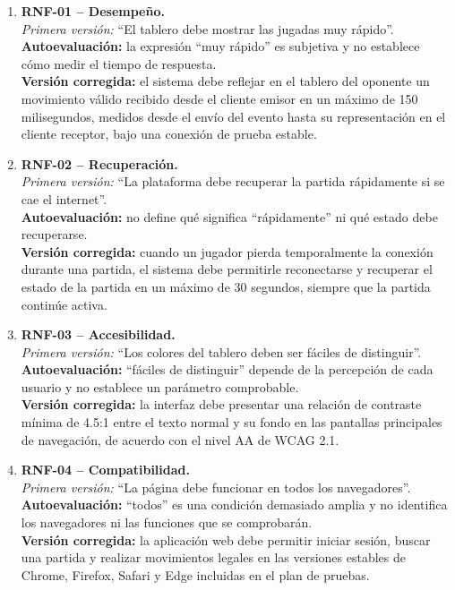 \documentclass[12pt,a4paper]{article}
\begin{document}
\begin{enumerate}[leftmargin=*]
    \item \textbf{RNF-01 -- Desempeño.}\\
    \textit{Primera versión:} ``El tablero debe mostrar las jugadas muy rápido''.\\
    \textbf{Autoevaluación:} la expresión ``muy rápido'' es subjetiva y no establece cómo medir el tiempo de respuesta.\\
    \textbf{Versión corregida:} el sistema debe reflejar en el tablero del oponente un movimiento válido recibido desde el cliente emisor en un máximo de 150 milisegundos, medidos desde el envío del evento hasta su representación en el cliente receptor, bajo una conexión de prueba estable.

    \item \textbf{RNF-02 -- Recuperación.}\\
    \textit{Primera versión:} ``La plataforma debe recuperar la partida rápidamente si se cae el internet''.\\
    \textbf{Autoevaluación:} no define qué significa ``rápidamente'' ni qué estado debe recuperarse.\\
    \textbf{Versión corregida:} cuando un jugador pierda temporalmente la conexión durante una partida, el sistema debe permitirle reconectarse y recuperar el estado de la partida en un máximo de 30 segundos, siempre que la partida continúe activa.

    \item \textbf{RNF-03 -- Accesibilidad.}\\
    \textit{Primera versión:} ``Los colores del tablero deben ser fáciles de distinguir''.\\
    \textbf{Autoevaluación:} ``fáciles de distinguir'' depende de la percepción de cada usuario y no establece un parámetro comprobable.\\
    \textbf{Versión corregida:} la interfaz debe presentar una relación de contraste mínima de 4.5:1 entre el texto normal y su fondo en las pantallas principales de navegación, de acuerdo con el nivel AA de WCAG 2.1.

    \item \textbf{RNF-04 -- Compatibilidad.}\\
    \textit{Primera versión:} ``La página debe funcionar en todos los navegadores''.\\
    \textbf{Autoevaluación:} ``todos'' es una condición demasiado amplia y no identifica los navegadores ni las funciones que se comprobarán.\\
    \textbf{Versión corregida:} la aplicación web debe permitir iniciar sesión, buscar una partida y realizar movimientos legales en las versiones estables de Chrome, Firefox, Safari y Edge incluidas en el plan de pruebas.


\end{enumerate}
\end{document}
